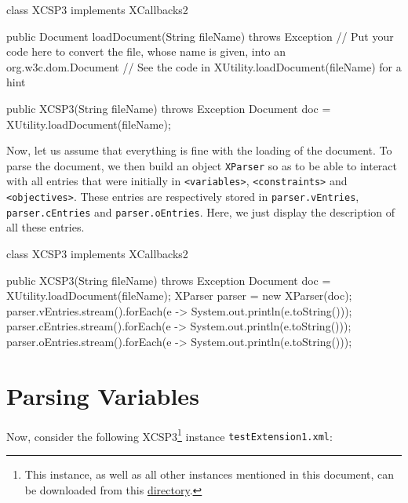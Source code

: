 \documentclass[10pt]{article}
\newenvironment{boxabsc}
               {\medskip \begin{bclogo}[barre=none,arrondi=0.2,logo=]{}\vspace{-0.6cm}}
               {\vspace{-0.1cm}\end{bclogo} \smallskip}
\newcommand{\xml}[1]{{\tt <#1>}} %
\newcommand{\nn}[1]{{\tt #1}} %
\begin{document}
\begin{boxabsc}
\begin{absc}
class XCSP3 implements XCallbacks2 { 
 
  public Document loadDocument(String fileName) throws Exception {
    // Put your code here to convert the file, whose name is given, into an org.w3c.dom.Document
    // See the code in XUtility.loadDocument(fileName) for a hint
  }

  public XCSP3(String fileName) throws Exception {
    Document doc = XUtility.loadDocument(fileName);
  }
}  
\end{absc} 
\end{boxabsc}

Now, let us assume that everything is fine with the loading of the document.
To parse the document, we then build an object \nn{XParser} so as to be able to interact with all entries that were initially in \xml{variables}, \xml{constraints} and \xml{objectives}.
These entries are respectively stored in \nn{parser.vEntries}, \nn{parser.cEntries} and \nn{parser.oEntries}.
Here, we just display the description of all these entries.

\begin{boxabsc}
\begin{absc}
class XCSP3 implements XCallbacks2 { 

  public XCSP3(String fileName) throws Exception {
    Document doc = XUtility.loadDocument(fileName);
    XParser parser = new XParser(doc);
    parser.vEntries.stream().forEach(e -> System.out.println(e.toString()));
    parser.cEntries.stream().forEach(e -> System.out.println(e.toString()));
    parser.oEntries.stream().forEach(e -> System.out.println(e.toString()));
  }
}  
\end{absc} 
\end{boxabsc}

\section{Parsing Variables}

Now, consider the following XCSP3\footnote{This instance, as well as all other instances mentioned in this document, can be downloaded from this \href{https://github.com/xcsp3team/XCSP3-Java-Tools/tree/master/instancesTest}{directory}.} instance \nn{testExtension1.xml}:
\end{document}
